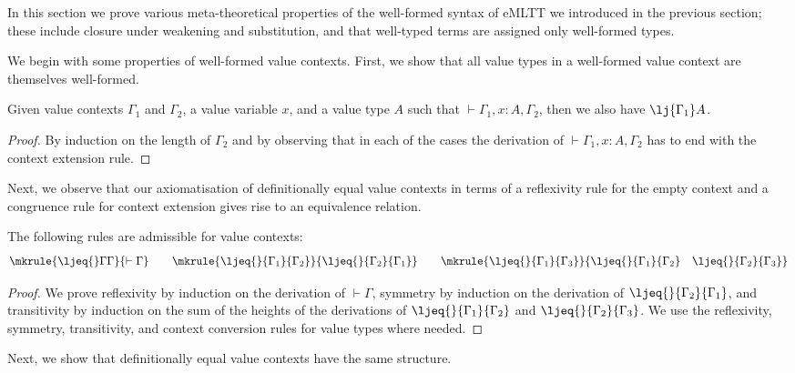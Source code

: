 In this section we prove various meta-theoretical properties of the well-formed syntax of eMLTT we introduced in the previous section; these include closure under weakening and substitution, and that well-typed terms are assigned only well-formed types. 

We begin with some properties of well-formed value contexts. First, we show that all value types in a well-formed value context are themselves well-formed.

\begin{proposition}
\label{prop:wellformedtypesinwellformedcontexts}
Given value contexts $\Gamma_1$ and $\Gamma_2$, a value variable $x$, and a value type $A$ such that $\vdash \Gamma_1, x \!:\! A, \Gamma_2$, then we also have $\lj {\Gamma_1} A$.
\end{proposition}

\begin{proof}
By induction on the length of $\Gamma_2$ and by observing that in each of the cases the derivation of $\vdash \Gamma_1, x \!:\! A, \Gamma_2$ has to end with the context extension rule. 
\end{proof}

Next, we observe that our axiomatisation of definitionally equal value contexts in terms of a reflexivity rule for the empty context and a congruence rule for context extension gives rise to an equivalence relation. 

\begin{proposition}
The following rules are admissible for value contexts:
\[
\mkrule
{\ljeq {} \Gamma \Gamma}
{\vdash \Gamma}
\qquad
\mkrule
{\ljeq {} {\Gamma_1} {\Gamma_2}}
{\ljeq {} {\Gamma_2} {\Gamma_1}}
\qquad
\mkrule
{\ljeq {} {\Gamma_1} {\Gamma_3}}
{\ljeq {} {\Gamma_1} {\Gamma_2} \quad \ljeq {} {\Gamma_2} {\Gamma_3}}
\]
\end{proposition}

\begin{proof}
We prove reflexivity by induction on the derivation of $\vdash \Gamma$, symmetry by induction on the derivation of $\ljeq {} {\Gamma_2} {\Gamma_1}$, and transitivity by induction on the sum of the heights of the derivations of $\ljeq {} {\Gamma_1} {\Gamma_2}$ and $\ljeq {} {\Gamma_2} {\Gamma_3}$. We use the reflexivity, 
symmetry, transitivity, and context conversion rules for value types where needed.
\end{proof}



Next, we show that definitionally equal value contexts have the same structure.

